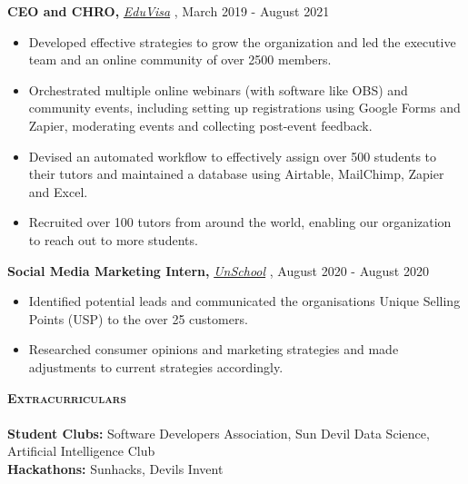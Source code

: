 \documentclass[a4paper]{article}
\newcommand{\lineunder} {
    \vspace*{-8pt} \\
    \hspace*{-18pt} \hrulefill \\
}
\newcommand{\header} [1] {
    {\hspace*{-15pt}\vspace*{3pt} \textsc{#1}}
    \vspace*{-6pt} \lineunder
}
\begin{document}
\textbf{CEO and CHRO, }\textit{{\href{https://myeduvisa.org/}{EduVisa}} \faExternalLink},   \hfill March 2019 - August 2021\\
\vspace{0mm}
\vspace{-1mm}
\begin{itemize} \itemsep 1pt
	\item Developed effective strategies to grow the organization and led the executive team and an online community of over 2500 members.
	\item Orchestrated multiple online webinars (with software like OBS) and community events, including setting up registrations using Google Forms and Zapier, moderating events and collecting post-event feedback.
	\item Devised an automated workflow to effectively assign over 500 students to their tutors and maintained a database using Airtable, MailChimp, Zapier and Excel.
	\item Recruited over 100 tutors from around the world, enabling our organization to reach out to more students.
\end{itemize}

\textbf{Social Media Marketing Intern, }\textit{{\href{https://www.unschool.in/}{UnSchool}} \faExternalLink},  \hfill August 2020 - August 2020\\
\vspace{0mm}
\vspace{-1mm}
\begin{itemize} \itemsep 1pt
	\item Identified potential leads and communicated the organisation\textquotesingle{}s Unique Selling Points (USP) to the over 25 customers.
	\item Researched consumer opinions and marketing strategies and made adjustments to current strategies accordingly.
\end{itemize}




\header{\textbf{Extracurriculars}}


\textbf{Student Clubs:} Software Developers Association, Sun Devil Data Science, Artificial Intelligence Club \\
\textbf{Hackathons:} Sunhacks, Devils Invent



\vspace{-50mm}
    


\ 
\end{document}
